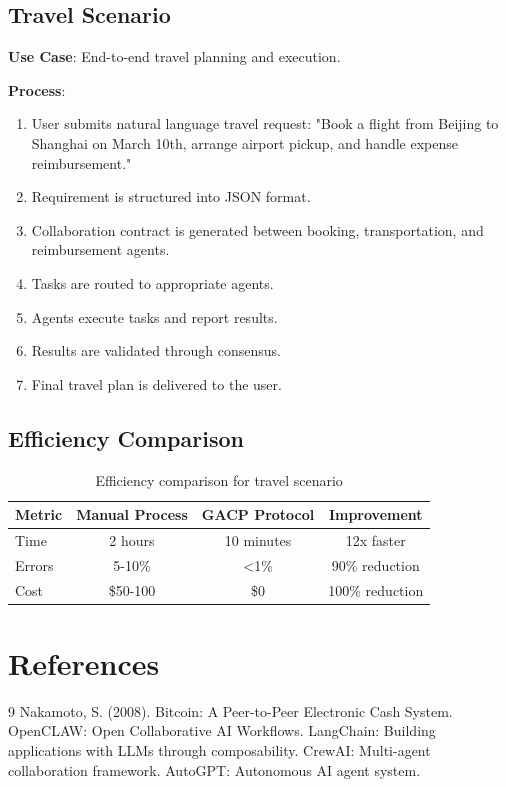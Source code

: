 \documentclass[11pt,twocolumn]{article}
\begin{document}
\subsection{Travel Scenario}
\textbf{Use Case}: End-to-end travel planning and execution.

\textbf{Process}:
\begin{enumerate}
  \item User submits natural language travel request: "Book a flight from Beijing to Shanghai on March 10th, arrange airport pickup, and handle expense reimbursement."
  \item Requirement is structured into JSON format.
  \item Collaboration contract is generated between booking, transportation, and reimbursement agents.
  \item Tasks are routed to appropriate agents.
  \item Agents execute tasks and report results.
  \item Results are validated through consensus.
  \item Final travel plan is delivered to the user.
\end{enumerate}

\subsection{Efficiency Comparison}
\begin{table}[h]
  \centering
  \begin{tabular}{@{}lccc@{}}
    \toprule
    Metric & Manual Process & GACP Protocol & Improvement \\
    \midrule
    Time & 2 hours & 10 minutes & 12x faster \\
    Errors & 5-10\% & <1\% & 90\% reduction \\
    Cost & \$50-100 & \$0 & 100\% reduction \\
    \bottomrule
  \end{tabular}
  \caption{Efficiency comparison for travel scenario}
  \label{tab:efficiency}
\end{table}

\section{References}

\begin{thebibliography}{9}
  Nakamoto, S. (2008). Bitcoin: A Peer-to-Peer Electronic Cash System.
  OpenCLAW: Open Collaborative AI Workflows.
  LangChain: Building applications with LLMs through composability.
  CrewAI: Multi-agent collaboration framework.
  AutoGPT: Autonomous AI agent system.
\end{thebibliography}
\end{document}
